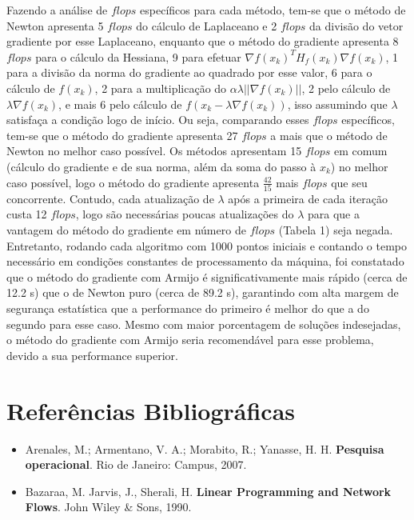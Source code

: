 \documentclass[a4paper, 12pt]{article}
\begin{document}
Fazendo a análise de $flops$ específicos para cada método, tem-se que o método de Newton apresenta 5 $flops$ do cálculo de Laplaceano e 2 $flops$ da divisão do vetor gradiente por esse Laplaceano, enquanto que o método do gradiente apresenta 8 $flops$ para o cálculo da Hessiana, 9 para efetuar $\nabla f(x_k)^TH_f(x_k)\nabla f(x_k)$, 1 para a divisão da norma do gradiente ao quadrado por esse valor, 6 para o cálculo de $f(x_k)$, 2 para a multiplicação do $\alpha\lambda||\nabla f(x_k)||$, 2 pelo cálculo de $\lambda\nabla f(x_k)$, e mais 6 pelo cálculo de $f(x_k-\lambda\nabla f(x_k))$, isso assumindo que $\lambda$ satisfaça a condição logo de início. Ou seja, comparando esses $flops$ específicos, tem-se que o método do gradiente apresenta 27 $flops$ a mais que o método de Newton no melhor caso possível. Os métodos apresentam 15 $flops$ em comum (cálculo do gradiente e de sua norma, além da soma do passo à $x_k$) no melhor caso possível, logo o método do gradiente apresenta $\frac{42}{15}$ mais $flops$ que seu concorrente. Contudo, cada atualização de $\lambda$ após a primeira de cada iteração custa 12 $flops$, logo são necessárias poucas atualizações do $\lambda$ para que a vantagem do método do gradiente em número de $flops$ (Tabela 1) seja negada. Entretanto, rodando cada algoritmo com 1000 pontos iniciais e contando o tempo necessário em condições constantes de processamento da máquina, foi constatado que o método do gradiente com Armijo é significativamente mais rápido (cerca de 12.2 s) que o de Newton puro (cerca de 89.2 s), garantindo com alta margem de segurança estatística que a performance do primeiro é melhor do que a do segundo para esse caso. Mesmo com maior porcentagem de soluções indesejadas, o método do gradiente com Armijo seria recomendável para esse problema, devido a sua performance superior.
\section{Referências Bibliográficas}
\begin{itemize}
\item Arenales, M.; Armentano, V. A.; Morabito, R.; Yanasse, H. H. \textbf{Pesquisa operacional}. Rio de Janeiro: Campus, 2007.
\item Bazaraa, M. Jarvis, J., Sherali, H. \textbf{Linear Programming and Network Flows}. John Wiley \& Sons, 1990.
\end{itemize}
\end{document}
